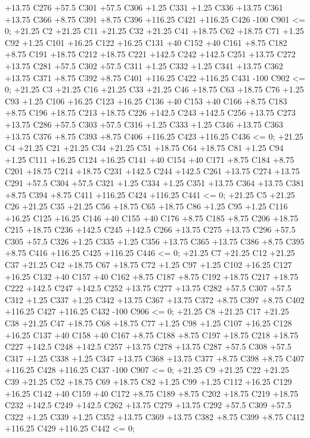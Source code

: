  +13.75 C276 +57.5 C301 +57.5 C306 +1.25 C331 +1.25 C336 +13.75 C361 +13.75 C366 +8.75 C391 +8.75 C396
 +116.25 C421 +116.25 C426 -100 C901 <= 0;
+21.25 C2 +21.25 C11 +21.25 C32 +21.25 C41 +18.75 C62 +18.75 C71 +1.25 C92 +1.25 C101 +16.25 C122 +16.25 C131
 +40 C152 +40 C161 +8.75 C182 +8.75 C191 +18.75 C212 +18.75 C221 +142.5 C242 +142.5 C251 +13.75 C272
 +13.75 C281 +57.5 C302 +57.5 C311 +1.25 C332 +1.25 C341 +13.75 C362 +13.75 C371 +8.75 C392 +8.75 C401
 +116.25 C422 +116.25 C431 -100 C902 <= 0;
+21.25 C3 +21.25 C16 +21.25 C33 +21.25 C46 +18.75 C63 +18.75 C76 +1.25 C93 +1.25 C106 +16.25 C123 +16.25 C136
 +40 C153 +40 C166 +8.75 C183 +8.75 C196 +18.75 C213 +18.75 C226 +142.5 C243 +142.5 C256 +13.75 C273
 +13.75 C286 +57.5 C303 +57.5 C316 +1.25 C333 +1.25 C346 +13.75 C363 +13.75 C376 +8.75 C393 +8.75 C406
 +116.25 C423 +116.25 C436 <= 0;
+21.25 C4 +21.25 C21 +21.25 C34 +21.25 C51 +18.75 C64 +18.75 C81 +1.25 C94 +1.25 C111 +16.25 C124 +16.25 C141
 +40 C154 +40 C171 +8.75 C184 +8.75 C201 +18.75 C214 +18.75 C231 +142.5 C244 +142.5 C261 +13.75 C274
 +13.75 C291 +57.5 C304 +57.5 C321 +1.25 C334 +1.25 C351 +13.75 C364 +13.75 C381 +8.75 C394 +8.75 C411
 +116.25 C424 +116.25 C441 <= 0;
+21.25 C5 +21.25 C26 +21.25 C35 +21.25 C56 +18.75 C65 +18.75 C86 +1.25 C95 +1.25 C116 +16.25 C125 +16.25 C146
 +40 C155 +40 C176 +8.75 C185 +8.75 C206 +18.75 C215 +18.75 C236 +142.5 C245 +142.5 C266 +13.75 C275
 +13.75 C296 +57.5 C305 +57.5 C326 +1.25 C335 +1.25 C356 +13.75 C365 +13.75 C386 +8.75 C395 +8.75 C416
 +116.25 C425 +116.25 C446 <= 0;
+21.25 C7 +21.25 C12 +21.25 C37 +21.25 C42 +18.75 C67 +18.75 C72 +1.25 C97 +1.25 C102 +16.25 C127 +16.25 C132
 +40 C157 +40 C162 +8.75 C187 +8.75 C192 +18.75 C217 +18.75 C222 +142.5 C247 +142.5 C252 +13.75 C277
 +13.75 C282 +57.5 C307 +57.5 C312 +1.25 C337 +1.25 C342 +13.75 C367 +13.75 C372 +8.75 C397 +8.75 C402
 +116.25 C427 +116.25 C432 -100 C906 <= 0;
+21.25 C8 +21.25 C17 +21.25 C38 +21.25 C47 +18.75 C68 +18.75 C77 +1.25 C98 +1.25 C107 +16.25 C128 +16.25 C137
 +40 C158 +40 C167 +8.75 C188 +8.75 C197 +18.75 C218 +18.75 C227 +142.5 C248 +142.5 C257 +13.75 C278
 +13.75 C287 +57.5 C308 +57.5 C317 +1.25 C338 +1.25 C347 +13.75 C368 +13.75 C377 +8.75 C398 +8.75 C407
 +116.25 C428 +116.25 C437 -100 C907 <= 0;
+21.25 C9 +21.25 C22 +21.25 C39 +21.25 C52 +18.75 C69 +18.75 C82 +1.25 C99 +1.25 C112 +16.25 C129 +16.25 C142
 +40 C159 +40 C172 +8.75 C189 +8.75 C202 +18.75 C219 +18.75 C232 +142.5 C249 +142.5 C262 +13.75 C279
 +13.75 C292 +57.5 C309 +57.5 C322 +1.25 C339 +1.25 C352 +13.75 C369 +13.75 C382 +8.75 C399 +8.75 C412
 +116.25 C429 +116.25 C442 <= 0;
